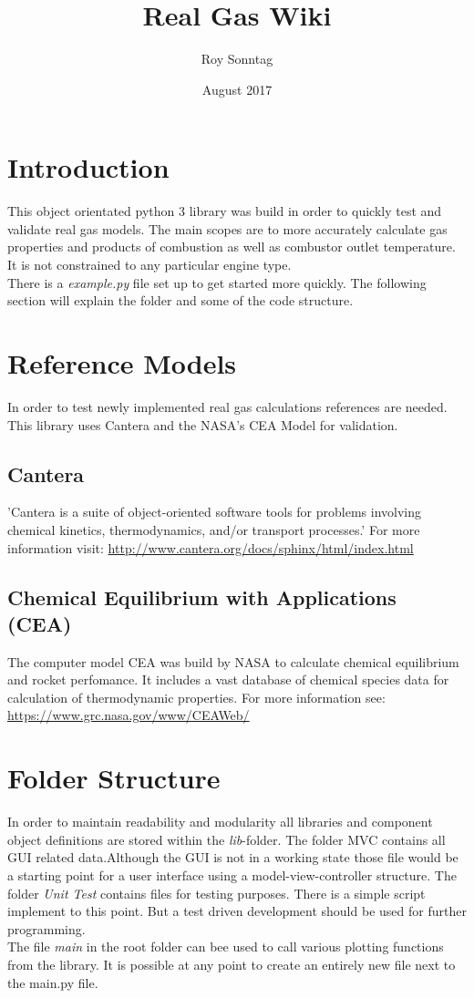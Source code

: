 \documentclass{article}
\title{Real Gas Wiki}
\author{Roy Sonntag}
\date{August 2017}
\begin{document}
\maketitle

\section{Introduction}
    This object orientated python 3 library was build in order to quickly test and validate real gas models. The main scopes are to more accurately calculate gas properties and products of combustion as well as combustor outlet temperature. It is not constrained to any particular engine type. \\
    There is a \textit{example.py} file set up to get started more quickly. The following section will explain the folder and some of the code structure.

\section{Reference Models}
    In order to test newly implemented real gas calculations references are needed. This library uses Cantera and the NASA's CEA Model for validation.
    \subsection{Cantera}
        'Cantera is a suite of object-oriented software tools for problems involving chemical kinetics, thermodynamics, and/or transport processes.' For more information visit: \url{http://www.cantera.org/docs/sphinx/html/index.html}
    \subsection{Chemical Equilibrium with Applications (CEA)}
        The computer model CEA was build by NASA to calculate chemical equilibrium and rocket perfomance.
        It includes a vast database of chemical species data for calculation of thermodynamic properties. For more information see: 
        \url{https://www.grc.nasa.gov/www/CEAWeb/}
\section{Folder Structure}
    In order to maintain readability and modularity all libraries and component object definitions are stored within the \textit{lib}-folder. The folder MVC contains all GUI related data.Although the GUI is not in a working state those file would be a starting point for a user interface using a model-view-controller structure. The folder \textit{Unit Test} contains files for testing purposes. There is a simple script implement to this point. But a test driven development should be used for further programming.\\
    The file \textit{main} in the root folder can bee used to call various plotting functions from the library. It is possible at any point to create an entirely new file next to the main.py file.
    
\end{document}
